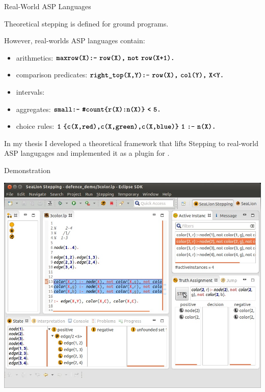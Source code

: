 \documentclass{beamer}
\begin{document}
\begin{frame}{Real-World ASP Languages}
	\onslide<+->
	
	Theoretical stepping is defined for ground programs.
	
	\onslide<+->
	
	However, real-worlds ASP languages contain:
	
	\begin{itemize}
		\item arithmetics: $\code{maxrow(X):-}\ \code{row(X),}\ \code{not}\ \code{row(X+1).}$
		\onslide<+->
		\item comparison predicates: $\code{right\_top(X,Y):-}\ \code{row(X),}\ \code{col(Y),}\ \code{X<Y.}$
		\onslide<+->
		\item intervals: 
		\onslide<+->
		\item aggregates: $\code{small:-}\ \code{\#count\{r(X):n(X)\}}\ \code{<}\ \code{5.}$
		\onslide<+->
		\item choice rules: $\code{1}\ \code{\{c(X,red),c(X,green),c(X,blue)\}}\ \code{1}\ \code{:-}\ \code{n(X).}$
	\end{itemize}
	
	\onslide<+->
	
	In my thesis I developed a theoretical framework that lifts Stepping to real-world ASP langugages
	and implemented it as a plugin for \sealion.
	
\end{frame}



\begin{frame}{Demonstration}
	
	\includegraphics[width=\textwidth]{stepping_perspective}
	
\end{frame}
\end{document}
